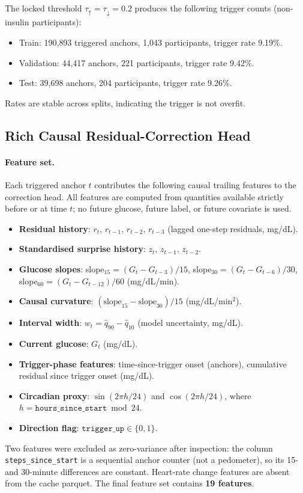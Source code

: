The locked threshold $\tau_{\uparrow} = \tau_{\downarrow} = 0.2$ produces
the following trigger counts (non-insulin participants):
\begin{itemize}
  \item Train: 190{,}893 triggered anchors, 1{,}043 participants, trigger rate 9.19\%.
  \item Validation: 44{,}417 anchors, 221 participants, trigger rate 9.42\%.
  \item Test: 39{,}698 anchors, 204 participants, trigger rate 9.26\%.
\end{itemize}
Rates are stable across splits, indicating the trigger is not overfit.

\subsection{Rich Causal Residual-Correction Head}
\label{subsec:study2_richhead}

\paragraph{Feature set.}
Each triggered anchor $t$ contributes the following causal trailing
features to the correction head.
All features are computed from quantities available strictly before or
at time $t$; no future glucose, future label, or future covariate is used.

\begin{itemize}
  \item \textbf{Residual history}: $r_t,\,r_{t-1},\,r_{t-2},\,r_{t-3}$
        (lagged one-step residuals, mg/dL).
  \item \textbf{Standardised surprise history}: $z_t,\,z_{t-1},\,z_{t-2}$.
  \item \textbf{Glucose slopes}:
        slope$_{15}=(G_t - G_{t-3})/15$,
        slope$_{30}=(G_t - G_{t-6})/30$,
        slope$_{60}=(G_t - G_{t-12})/60$ (mg/dL/min).
  \item \textbf{Causal curvature}: $(\text{slope}_{15} - \text{slope}_{30})/15$ (mg/dL/min$^2$).
  \item \textbf{Interval width}: $w_t = \hat{q}_{90} - \hat{q}_{10}$ (model uncertainty, mg/dL).
  \item \textbf{Current glucose}: $G_t$ (mg/dL).
  \item \textbf{Trigger-phase features}: time-since-trigger onset (anchors),
        cumulative residual since trigger onset (mg/dL).
  \item \textbf{Circadian proxy}: $\sin(2\pi h/24)$ and $\cos(2\pi h/24)$,
        where $h = \mathtt{hours\_since\_start} \bmod 24$.
  \item \textbf{Direction flag}: $\mathtt{trigger\_up} \in \{0,1\}$.
\end{itemize}
Two features were excluded as zero-variance after inspection:
the column \texttt{steps\_since\_start} is a sequential anchor counter
(not a pedometer), so its 15- and 30-minute differences are constant.
Heart-rate change features are absent from the cache parquet.
The final feature set contains \textbf{19 features}.

